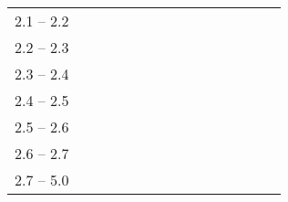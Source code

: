 {{\begin{tabular}{|c|c|c|c|c|c|c|c|c|c|c|c|c|c|c|}
            \cline{1-2}\cline{7-7}\cline{13-13}
            2.1 -- 2.2               & &                                      &                                        &                                   &                                  & &                 &                  &                   &                  &                    & &                   & \\   
            \cline{1-2}\cline{7-7}\cline{13-13}
            2.2 -- 2.3               & &                                      &                                        &                                   &                                  & &                &                  &                   &                  &                    &  &                  & \\   
            \cline{1-2}\cline{7-7}\cline{13-13}
            2.3 -- 2.4               & &                                      &                                        &                                   &                                  & &                &                  &                   &                  &                    & &                   & \\   
            \cline{1-2}\cline{7-7}\cline{13-13}
            2.4 -- 2.5               & &                                     &                                        &                                   &                                  & &                &                  &                   &                  &                    &  &                  & \\   
            \cline{1-2}\cline{7-7}\cline{13-13}
            2.5 -- 2.6               & &                                     &                                        &                                   &                                  & &                 &                  &                   &                  &                    &  &                  & \\   
            \cline{1-2}\cline{7-7}\cline{13-13}
            2.6 -- 2.7               & &                                     &                                        &                                   &                                  & &                &                  &                   &                  &                    & &                   & \\   
            \cline{1-2}\cline{7-7}\cline{13-13}
            2.7 -- 5.0               & &                                     &                                        &                                   &                                  & &                &                  &                   &                  &                    &  &                  & \\   
            \hline
        \end{tabular}
    }
}
